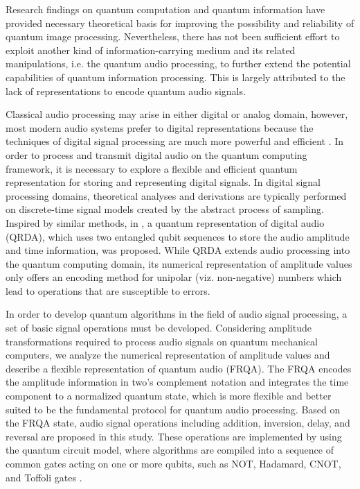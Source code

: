 \documentclass[10pt,journal,compsoc]{IEEEtran}
\begin{document}
Research findings on quantum computation and quantum information have provided necessary theoretical basis for improving the possibility and reliability of quantum image processing. Nevertheless, there has not been sufficient effort to exploit another kind of information-carrying medium and its related manipulations, i.e. the quantum audio processing, to further extend the potential capabilities of quantum information processing. This is largely attributed to the lack of representations to encode quantum audio signals.

Classical audio processing may arise in either digital or analog domain, however, most modern audio systems prefer to digital representations because the techniques of digital signal processing are much more powerful and efficient \cite{8}. In order to process and transmit digital audio on the quantum computing framework, it is necessary to explore a flexible and efficient quantum representation for storing and representing digital signals. In digital signal processing domains, theoretical analyses and derivations are typically performed on discrete-time signal models created by the abstract process of sampling. Inspired by similar methods, in \cite{9}, a quantum representation of digital audio (QRDA), which uses two entangled qubit sequences to store the audio amplitude and time information, was proposed. While QRDA extends audio processing into the quantum computing domain, its numerical representation of amplitude values only offers an encoding method for unipolar (viz. non-negative) numbers which lead to operations that are susceptible to errors.

In order to develop quantum algorithms in the field of audio signal processing, a set of basic signal operations must be developed. Considering amplitude transformations required to process audio signals on quantum mechanical computers, we analyze the numerical representation of amplitude values and describe a flexible representation of quantum audio (FRQA). The FRQA encodes the amplitude information in two's complement notation and integrates the time component to a normalized quantum state, which is more flexible and better suited to be the fundamental protocol for quantum audio processing. Based on the FRQA state, audio signal operations including addition, inversion, delay, and reversal are proposed in this study. These operations are implemented by using the quantum circuit model, where algorithms are compiled into a sequence of common gates acting on one or more qubits, such as NOT, Hadamard, CNOT, and Toffoli gates \cite{10}.
\end{document}

